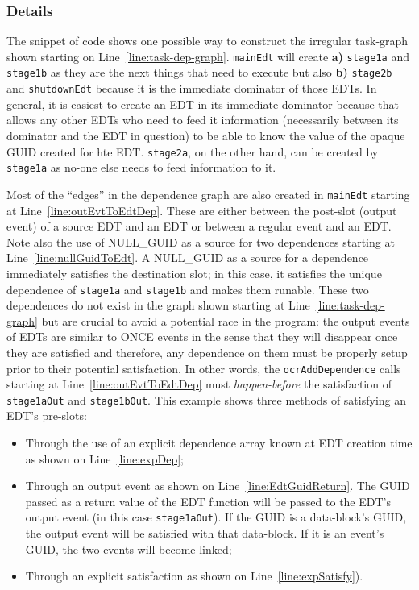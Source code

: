 \subsubsection{Details}
The snippet of code shows one possible way to construct the irregular
task-graph shown starting on
Line~\ref{line:task-dep-graph}. \texttt{mainEdt} will create {\bf a)}
\texttt{stage1a} and \texttt{stage1b} as they are the next things that
need to execute but also {\bf b)} \texttt{stage2b} and
\texttt{shutdownEdt} because it is the immediate dominator of those
EDTs. In general, it is easiest to create an EDT in its immediate
dominator because that allows any other EDTs who need to feed it
information (necessarily between its dominator and the EDT in
question) to be able to know the value of the opaque GUID created for
hte EDT. \texttt{stage2a}, on the other hand, can be created by
\texttt{stage1a} as no-one else needs to feed information to it.

Most of the ``edges'' in the dependence graph are also created in
\texttt{mainEdt} starting at Line~\ref{line:outEvtToEdtDep}. These
are either between the post-slot (output event) of a source EDT and
an EDT or between a regular event and an EDT. Note also the use of
NULL\_GUID as a source for two dependences starting at
Line~\ref{line:nullGuidToEdt}. A NULL\_GUID as a source for a
dependence immediately satisfies the destination slot; in this case,
it satisfies the unique dependence of \texttt{stage1a} and
\texttt{stage1b} and makes them runable. These two dependences do not
exist in the graph shown starting at Line~\ref{line:task-dep-graph}
but are crucial to avoid a potential race in the program: the output
events of EDTs are similar to ONCE events in the sense that they will
disappear once they are satisfied and therefore, any dependence on
them must be properly setup prior to their potential satisfaction. In
other words, the \texttt{ocrAddDependence} calls starting at
Line~\ref{line:outEvtToEdtDep} must \emph{happen-before} the
satisfaction of \texttt{stage1aOut} and \texttt{stage1bOut}.
This example shows three methods of satisfying an EDT's pre-slots:
\begin{itemize}
\item{Through the use of an explicit dependence array known at EDT
    creation time as shown on Line~\ref{line:expDep};}
\item{Through an output event as shown on
    Line~\ref{line:EdtGuidReturn}. The GUID passed as a return value
    of the EDT function will be passed to the EDT's output event (in
    this case \texttt{stage1aOut}). If the GUID is a data-block's
    GUID, the output event will be satisfied with that data-block. If
    it is an event's GUID, the two events will become linked;}
\item{Through an explicit satisfaction as shown on
    Line~\ref{line:expSatisfy}).}
\end{itemize}
